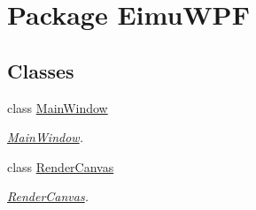 \hypertarget{namespace_eimu_w_p_f}{
\section{Package EimuWPF}
\label{namespace_eimu_w_p_f}
}
\subsection*{Classes}
\begin{DoxyCompactItemize}
\item 
class \hyperlink{class_eimu_w_p_f_1_1_main_window}{MainWindow}
\begin{DoxyCompactList}\small\item\em \hyperlink{class_eimu_w_p_f_1_1_main_window}{MainWindow}. \item\end{DoxyCompactList}\item 
class \hyperlink{class_eimu_w_p_f_1_1_render_canvas}{RenderCanvas}
\begin{DoxyCompactList}\small\item\em \hyperlink{class_eimu_w_p_f_1_1_render_canvas}{RenderCanvas}. \item\end{DoxyCompactList}\end{DoxyCompactItemize}
